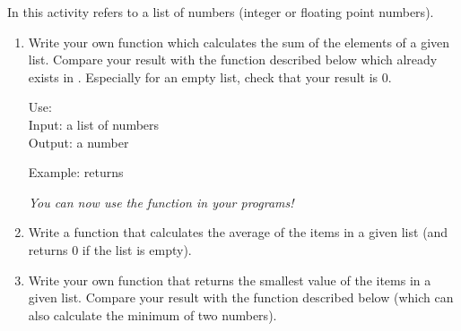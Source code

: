 \documentclass[11pt,class=report,crop=false]{standalone}
\begin{document}




\begin{activite}


In this activity  refers to a list of numbers (integer or floating point numbers). 

\begin{enumerate}
  \item Write your own function  which calculates the sum of the elements of a given list.
  Compare your result with the function  described below which already exists in \Python{}. Especially for an empty list, check that your result is $0$. 
  
  
  \begin{fonctionpython}
   Use: \\
   Input: a list of numbers\\
   Output: a number
  
  \medskip
     
  Example:  returns 
  \end{fonctionpython}   
  
  \emph{You can now use the function  in your programs!}
  
  
  \item Write a function  that calculates the average of the items in a given list (and returns $0$ if the list is empty). 
  
  \item Write your own function  that returns the smallest value of the items in a given list. Compare your result with the \Python{} function  described below (which can also calculate the minimum of two numbers).
  

\end{enumerate}
\end{activite}
\end{document}
